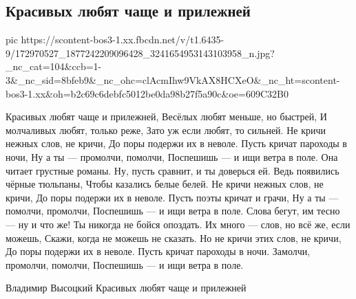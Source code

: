  
 
 
 
 

\subsection{Красивых любят чаще и прилежней}


\ifcmt
  pic https://scontent-bos3-1.xx.fbcdn.net/v/t1.6435-9/172970527_1877242209096428_3241654953143103958_n.jpg?_nc_cat=104&ccb=1-3&_nc_sid=8bfeb9&_nc_ohc=clAcmIhw9VkAX8HCXeO&_nc_ht=scontent-bos3-1.xx&oh=b2c69c6debfc5012be0da98b27f5a90c&oe=609C32B0
\fi

Красивых любят чаще и прилежней, 
Весёлых любят меньше, но быстрей, 
И молчаливых любят, только реже, 
Зато уж если любят, то сильней. 
Не кричи нежных слов, не кричи, 
До поры подержи их в неволе. 
Пусть кричат пароходы в ночи, 
Ну а ты — промолчи, помолчи, 
Поспешишь — и ищи ветра в поле. 
Она читает грустные романы. 
Ну, пусть сравнит, и ты доверься ей. 
Ведь появились чёрные тюльпаны, 
Чтобы казались белые белей. 
Не кричи нежных слов, не кричи, 
До поры подержи их в неволе. 
Пусть поэты кричат и грачи, 
Ну а ты — помолчи, промолчи, 
Поспешишь — и ищи ветра в поле. 
Слова бегут, им тесно — ну и что же! 
Ты никогда не бойся опоздать. 
Их много — слов, но всё же, если можешь, 
Скажи, когда не можешь не сказать. 
Но не кричи этих слов, не кричи, 
До поры подержи их в неволе. 
Пусть кричат пароходы в ночи. 
Замолчи, промолчи, помолчи, 
Поспешишь — и ищи ветра в поле.

Владимир Высоцкий 
Красивых любят чаще и прилежней
